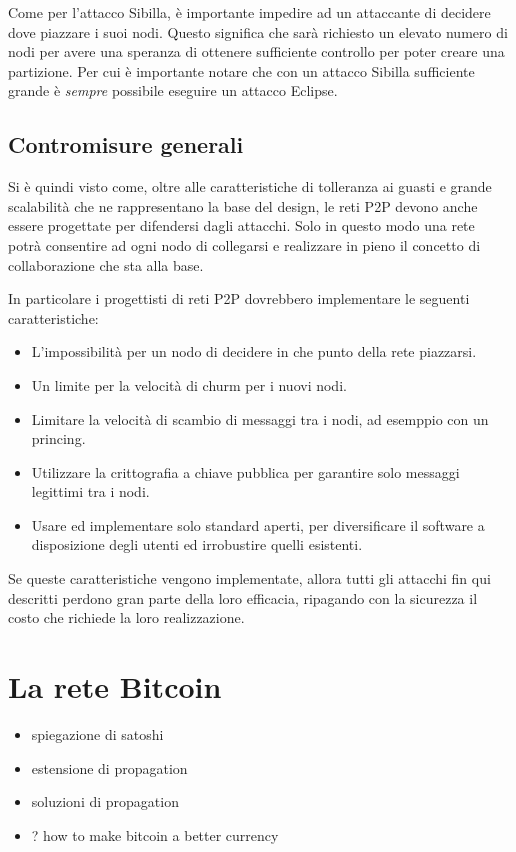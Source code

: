Come per l'attacco Sibilla, è importante impedire ad un attaccante di decidere dove piazzare i suoi nodi. Questo significa che sarà richiesto un elevato numero di nodi per avere una speranza di ottenere sufficiente controllo per poter creare una partizione. Per cui è importante notare che con un attacco Sibilla sufficiente grande è \emph{sempre} possibile eseguire un attacco Eclipse.

\subsection{Contromisure generali}\label{contromisure-generali}

Si è quindi visto come, oltre alle caratteristiche di tolleranza ai guasti e grande scalabilità che ne rappresentano la base del design, le reti P2P devono anche essere progettate per difendersi dagli attacchi. Solo in questo modo una rete potrà consentire ad ogni nodo di collegarsi e realizzare in pieno il concetto di collaborazione che sta alla base.

In particolare i progettisti di reti P2P dovrebbero implementare le seguenti caratteristiche:

\begin{itemize}
\itemsep1pt\parskip0pt
\item
  L'impossibilità per un nodo di decidere in che punto della rete   piazzarsi.
\item
  Un limite per la velocità di churm per i nuovi nodi.
\item
  Limitare la velocità di scambio di messaggi tra i nodi, ad esemppio   con un princing.
\item
  Utilizzare la crittografia a chiave pubblica per garantire solo   messaggi legittimi tra i nodi.
\item
  Usare ed implementare solo standard aperti, per diversificare il   software a disposizione degli utenti ed irrobustire quelli esistenti.
\end{itemize}

Se queste caratteristiche vengono implementate, allora tutti gli attacchi fin qui descritti perdono gran parte della loro efficacia, ripagando con la sicurezza il costo che richiede la loro realizzazione.

\section{La rete Bitcoin}\label{la-rete-bitcoin}

\begin{itemize}
\itemsep1pt\parskip0pt
\item
  spiegazione di satoshi
\item
  estensione di propagation
\item
  soluzioni di propagation
\item
  ? how to make bitcoin a better currency
\end{itemize}

